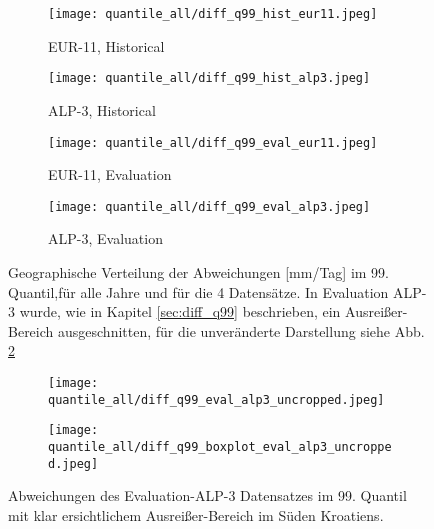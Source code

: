 \begin{figure}
	\begin{subfigure}{0.49\textwidth}
		\texttt{[image: quantile\_all/diff\_q99\_hist\_eur11.jpeg]}
		\caption{EUR-11, Historical}
	\end{subfigure}
	\begin{subfigure}{0.49\textwidth}
		\texttt{[image: quantile\_all/diff\_q99\_hist\_alp3.jpeg]}
		\caption{ALP-3, Historical}
	\end{subfigure}
	\begin{subfigure}{0.49\textwidth}
		\texttt{[image: quantile\_all/diff\_q99\_eval\_eur11.jpeg]}
		\caption{EUR-11, Evaluation}
	\end{subfigure}
	\begin{subfigure}{0.49\textwidth}
		\texttt{[image: quantile\_all/diff\_q99\_eval\_alp3.jpeg]}
		\caption{ALP-3, Evaluation}
	\end{subfigure}
	\caption{Geographische Verteilung der Abweichungen [mm/Tag] im 99. Quantil,für alle Jahre und für die 4 Datensätze. In Evaluation ALP-3 wurde, wie in Kapitel \ref{sec:diff_q99} beschrieben, ein Ausreißer-Bereich ausgeschnitten, für die unveränderte Darstellung siehe Abb. \ref{fig:quantile_eval_alp3}}
	\label{fig:quantile_all}
\end{figure}
\begin{figure}
	\begin{subfigure}{0.49\textwidth}
		\texttt{[image: quantile\_all/diff\_q99\_eval\_alp3\_uncropped.jpeg]}
	\end{subfigure}
	\begin{subfigure}{0.49\textwidth}
		\texttt{[image: quantile\_all/diff\_q99\_boxplot\_eval\_alp3\_uncropped.jpeg]}
	\end{subfigure}
	\caption{Abweichungen des Evaluation-ALP-3 Datensatzes im 99. Quantil mit klar ersichtlichem Ausreißer-Bereich im Süden Kroatiens.}
	\label{fig:quantile_eval_alp3}
\end{figure}

